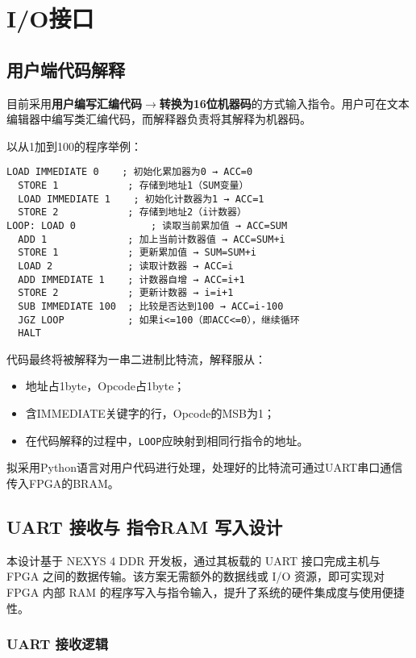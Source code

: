 \documentclass[lang=cn,a4paper,newtx]{elegantpaper}
\begin{document}
\section{I/O接口}
\subsection{用户端代码解释}
目前采用\textbf{用户编写汇编代码}$\to$\textbf{转换为16位机器码}的方式输入指令。用户可在文本编辑器中编写类汇编代码，而解释器负责将其解释为机器码。

以从1加到100的程序举例：
\begin{lstlisting}[language=Assembly]
  LOAD IMMEDIATE 0    ; 初始化累加器为0 → ACC=0
  STORE 1            ; 存储到地址1（SUM变量）
  LOAD IMMEDIATE 1    ; 初始化计数器为1 → ACC=1
  STORE 2            ; 存储到地址2（i计数器）
LOOP: LOAD 0             ; 读取当前累加值 → ACC=SUM
  ADD 1              ; 加上当前计数器值 → ACC=SUM+i
  STORE 1            ; 更新累加值 → SUM=SUM+i
  LOAD 2             ; 读取计数器 → ACC=i
  ADD IMMEDIATE 1    ; 计数器自增 → ACC=i+1
  STORE 2            ; 更新计数器 → i=i+1
  SUB IMMEDIATE 100  ; 比较是否达到100 → ACC=i-100
  JGZ LOOP           ; 如果i<=100（即ACC<=0），继续循环
  HALT
\end{lstlisting}

代码最终将被解释为一串二进制比特流，解释服从：
\begin{itemize}
  \item 地址占1byte，Opcode占1byte；
  \item 含IMMEDIATE关键字的行，Opcode的MSB为1；
  \item 在代码解释的过程中，\texttt{LOOP}应映射到相同行指令的地址。
\end{itemize}

拟采用Python语言对用户代码进行处理，处理好的比特流可通过UART串口通信传入FPGA的BRAM。


\subsection{UART 接收与 指令RAM 写入设计}

本设计基于 NEXYS 4 DDR 开发板，通过其板载的 UART 接口完成主机与 FPGA 之间的数据传输。该方案无需额外的数据线或 I/O 资源，即可实现对 FPGA 内部 RAM 的程序写入与指令输入，提升了系统的硬件集成度与使用便捷性。

\subsubsection{UART 接收逻辑}
\end{document}
